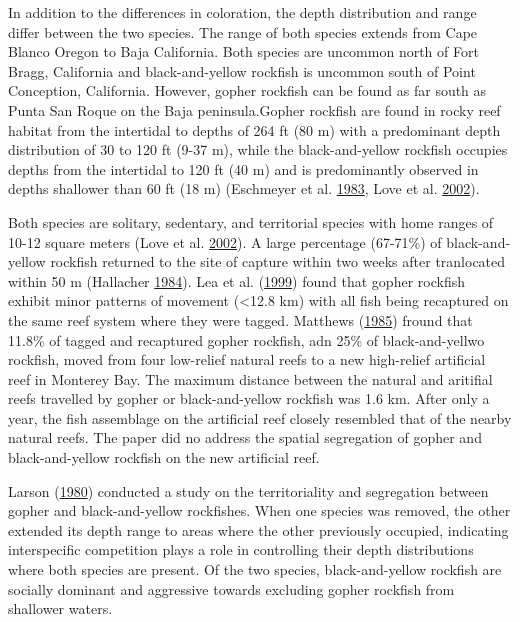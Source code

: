 \documentclass[12pt,]{article}
\begin{document}
In addition to the differences in coloration, the depth distribution and
range differ between the two species. The range of both species extends
from Cape Blanco Oregon to Baja California. Both species are uncommon
north of Fort Bragg, California and black-and-yellow rockfish is
uncommon south of Point Conception, California. However, gopher rockfish
can be found as far south as Punta San Roque on the Baja
peninsula.Gopher rockfish are found in rocky reef habitat from the
intertidal to depths of 264 ft (80 m) with a predominant depth
distribution of 30 to 120 ft (9-37 m), while the black-and-yellow
rockfish occupies depths from the intertidal to 120 ft (40 m) and is
predominantly observed in depths shallower than 60 ft (18 m) (Eschmeyer
et al. \protect\hyperlink{ref-Eschmeyer1983}{1983}, Love et al.
\protect\hyperlink{ref-Love2002}{2002}).

Both species are solitary, sedentary, and territorial species with home
ranges of 10-12 square meters (Love et al.
\protect\hyperlink{ref-Love2002}{2002}). A large percentage (67-71\%) of
black-and-yellow rockfish returned to the site of capture within two
weeks after tranlocated within 50 m (Hallacher
\protect\hyperlink{ref-Hallacher1984}{1984}). Lea et al.
(\protect\hyperlink{ref-Lea1999}{1999}) found that gopher rockfish
exhibit minor patterns of movement (\textless{}12.8 km) with all fish
being recaptured on the same reef system where they were tagged.
Matthews (\protect\hyperlink{ref-Matthews1985}{1985}) fround that 11.8\%
of tagged and recaptured gopher rockfish, adn 25\% of black-and-yellwo
rockfish, moved from four low-relief natural reefs to a new high-relief
artificial reef in Monterey Bay. The maximum distance between the
natural and aritifial reefs travelled by gopher or black-and-yellow
rockfish was 1.6 km. After only a year, the fish assemblage on the
artificial reef closely resembled that of the nearby natural reefs. The
paper did no address the spatial segregation of gopher and
black-and-yellow rockfish on the new artificial reef.

Larson (\protect\hyperlink{ref-Larson1980}{1980}) conducted a study on
the territoriality and segregation between gopher and black-and-yellow
rockfishes. When one species was removed, the other extended its depth
range to areas where the other previously occupied, indicating
interspecific competition plays a role in controlling their depth
distributions where both species are present. Of the two species,
black-and-yellow rockfish are socially dominant and aggressive towards
excluding gopher rockfish from shallower waters.
\end{document}
